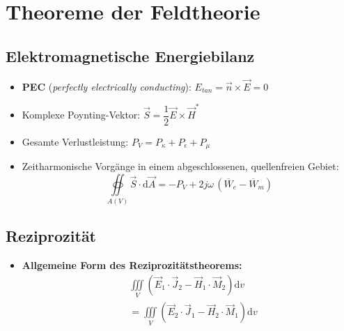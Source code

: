 \section{Theoreme der Feldtheorie}
\subsection{Elektromagnetische Energiebilanz}
\begin{itemize}
    \itemsep0pt
    \item \textbf{PEC} (\textit{perfectly electrically conducting}): \(E_{tan} = \vec{n} \times \vec{E} = 0\)
    \item Komplexe Poynting-Vektor: \(\vec{S} = \dfrac{1}{2} \vec{E} \times \vec{H}^*\)
    \item Gesamte Verlustleistung: \(P_V = P_\kappa + P_\epsilon + P_\mu\)
    \item Zeitharmonische Vorgänge in einem abgeschlossenen, quellenfreien Gebiet:\\
        \[\oiint\limits_{A(V)}\vec{S}\cdot\mathrm{d}\vec{A} = - P_V + 2j\omega\,(\overline{W}_e - \overline{W}_m)\]
\end{itemize}
\subsection{Reziprozität}
\begin{itemize}
    \item \textbf{Allgemeine Form des Reziprozitätstheorems:}\\
        \begin{align*}
            &\iiint\limits_V\left(\vec{E}_1 \cdot \vec{J}_2 - \vec{H}_1 \cdot \vec{M}_2\right)\mathrm{d}v\\
            &= \iiint\limits_V\left(\vec{E}_2 \cdot \vec{J}_1 - \vec{H}_2 \cdot \vec{M}_1\right)\mathrm{d}v
        \end{align*}
\end{itemize}
